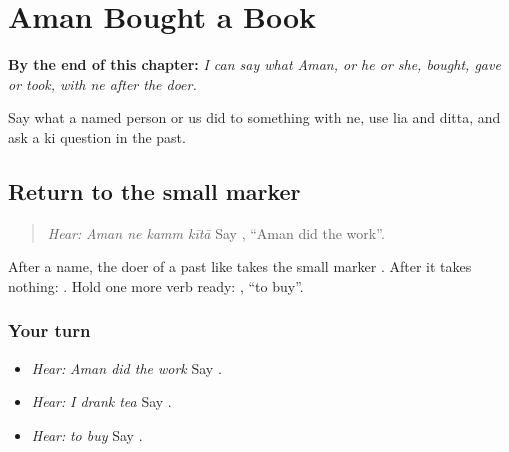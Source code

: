 
\chapter{Aman Bought a Book}
\label{ch:pa-a2-ne-past}

\begin{chapteropening}
\textbf{By the end of this chapter:} \emph{I can say what Aman, or he or she, bought, gave or took, with ne after the doer.}

Say what a named person or us did to something with ne, use lia and ditta, and ask a ki question in the past.
\end{chapteropening}

\section[\texorpdfstring{\pa{ਅਮਨ} \pa{ਨੇ} \pa{ਕੰਮ} \pa{ਕੀਤਾ} … (Aman ne kamm …)}{ਅਮਨ ਨੇ ਕੰਮ ਕੀਤਾ … (Aman ne kamm …)}]{Return to the small marker}

\label{lesson:PA-C220-ne-return}



\begin{quote}
\emph{Hear:} \emph{Aman ne kamm kītā} Say \textbf{   }, \textquotedblleft{}Aman did the work\textquotedblright{}.
\end{quote}

\begin{grammarlens}[title={Grammar Lens}]
After a name, the doer of a past like \textbf{} takes the small marker \textbf{}. After \textbf{} it takes nothing: \textbf{  }. Hold one more verb ready: \textbf{}, \textquotedblleft{}to buy\textquotedblright{}.
\end{grammarlens}

\subsection*{Your turn}
\begin{itemize}
\raggedright
  \item \emph{Hear:} \emph{Aman did the work} Say \textbf{   }.
  \item \emph{Hear:} \emph{I drank tea} Say \textbf{  }.
  \item \emph{Hear:} \emph{to buy} Say \textbf{}.
\end{itemize}

